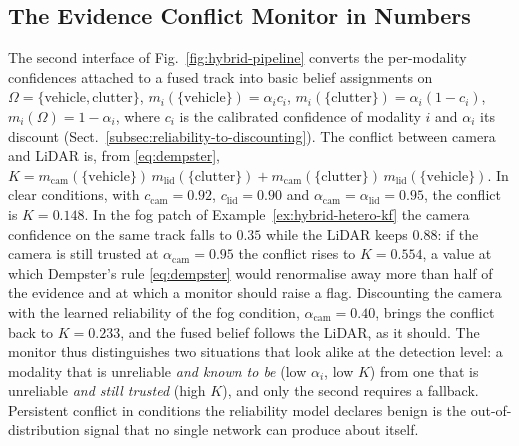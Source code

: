 \documentclass[graybox,envcountchap]{style/SNmono}
\begin{document}
\subsection{The Evidence Conflict Monitor in Numbers}
\label{subsec:conflict-monitor}
The second interface of Fig.~\ref{fig:hybrid-pipeline} converts the per-modality confidences attached to a fused track into basic belief assignments on $\Omega=\{\text{vehicle},\text{clutter}\}$, $m_i(\{\text{vehicle}\})=\alpha_i c_i$, $m_i(\{\text{clutter}\})=\alpha_i(1-c_i)$, $m_i(\Omega)=1-\alpha_i$, where $c_i$ is the calibrated confidence of modality $i$ and $\alpha_i$ its discount (Sect.~\ref{subsec:reliability-to-discounting}). The conflict between camera and LiDAR is, from \eqref{eq:dempster}, $K=m_{\mathrm{cam}}(\{\text{vehicle}\})\,m_{\mathrm{lid}}(\{\text{clutter}\})+m_{\mathrm{cam}}(\{\text{clutter}\})\,m_{\mathrm{lid}}(\{\text{vehicle}\})$. In clear conditions, with $c_{\mathrm{cam}}=0.92$, $c_{\mathrm{lid}}=0.90$ and $\alpha_{\mathrm{cam}}=\alpha_{\mathrm{lid}}=0.95$, the conflict is $K=0.148$. In the fog patch of Example~\ref{ex:hybrid-hetero-kf} the camera confidence on the same track falls to $0.35$ while the LiDAR keeps $0.88$: if the camera is still trusted at $\alpha_{\mathrm{cam}}=0.95$ the conflict rises to $K=0.554$, a value at which Dempster's rule \eqref{eq:dempster} would renormalise away more than half of the evidence and at which a monitor should raise a flag. Discounting the camera with the learned reliability of the fog condition, $\alpha_{\mathrm{cam}}=0.40$, brings the conflict back to $K=0.233$, and the fused belief follows the LiDAR, as it should. The monitor thus distinguishes two situations that look alike at the detection level: a modality that is unreliable \emph{and known to be} (low $\alpha_i$, low $K$) from one that is unreliable \emph{and still trusted} (high $K$), and only the second requires a fallback. Persistent conflict in conditions the reliability model declares benign is the out-of-distribution signal that no single network can produce about itself.
\end{document}
